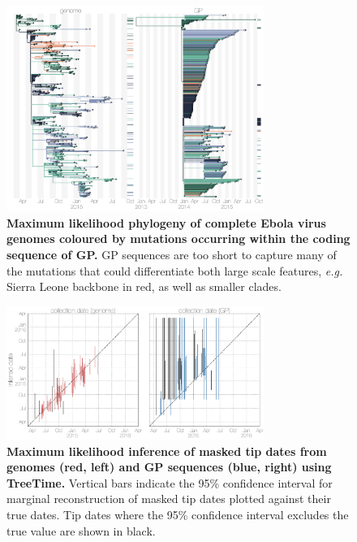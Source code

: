 \documentclass[11pt,oneside,letterpaper]{article}
\begin{document}
\begin{figure}[h]
 \centering
	\includegraphics[width=0.75\textwidth]{supp_figures/sfigX_treetimeTrees.png}
	\caption{\textbf{Maximum likelihood phylogeny of complete Ebola virus genomes coloured by mutations occurring within the coding sequence of GP.}
  GP sequences are too short to capture many of the mutations that could differentiate both large scale features, \textit{e.g.} Sierra Leone backbone in red, as well as smaller clades.
	}
	\label{TTtrees}
\end{figure}

\begin{figure}[h]
 \centering
	\includegraphics[width=0.75\textwidth]{supp_figures/sfigX_treetimeDates.png}
	\caption{\textbf{Maximum likelihood inference of masked tip dates from genomes (red, left) and GP sequences (blue, right) using TreeTime.}
  Vertical bars indicate the 95\% confidence interval for marginal reconstruction of masked tip dates plotted against their true dates.
  Tip dates where the 95\% confidence interval excludes the true value are shown in black.
	}
	\label{TTdates}
\end{figure}
\end{document}
